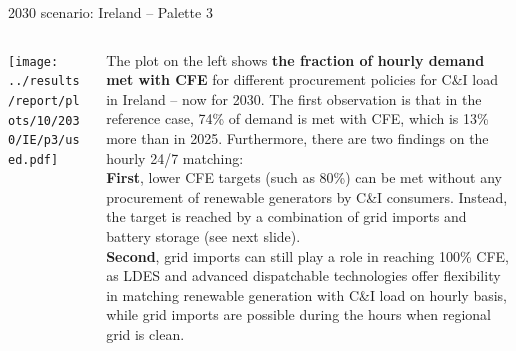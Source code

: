 \begin{frame}{2030 scenario: Ireland -- Palette 3}

{\footnotesize

\begin{columns}[T]
\begin{column}{9cm}
\centering

\texttt{[image: ../results/report/plots/10/2030/IE/p3/used.pdf]}
\end{column}
\begin{column}{6cm}

\vspace{0.1cm}
The plot on the left shows {\bf the fraction of hourly demand met with CFE} 
for different procurement policies for C\&I load in Ireland -- now for 2030.
The first observation is that in the reference case,
74\% of demand is met with CFE, which is 13\% more than in 2025. 
Furthermore, there are \alert{two findings} 
on the hourly 24/7 matching: \\

\vspace{0.1cm}
{\bf First}, lower CFE targets (such as 80\%) can be met without 
any procurement of renewable generators by C\&I consumers. Instead,
the target is reached by a combination of grid imports and battery
storage (see next slide). \\

\vspace{0.1cm}
{\bf Second}, grid imports can still play a role in reaching 100\% CFE,
as LDES and advanced dispatchable technologies offer flexibility
in matching renewable generation with C\&I load on hourly basis, while 
grid imports are possible during the hours when regional grid is clean. 

\end{column}
\end{columns}
}
\end{frame}



